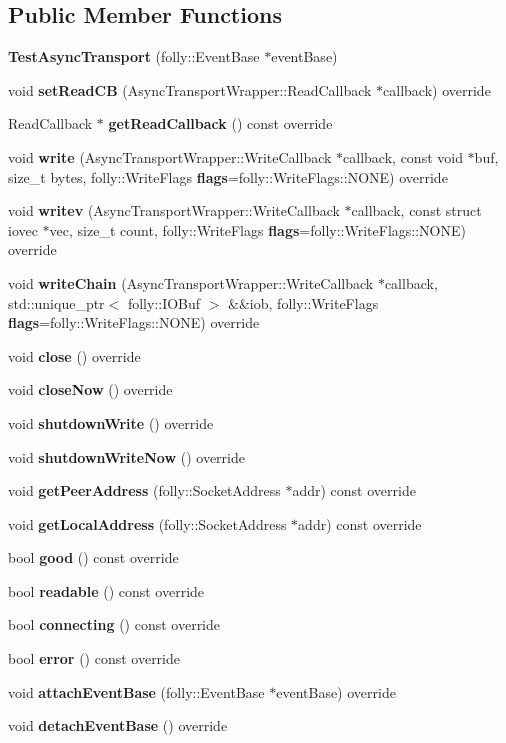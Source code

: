 \subsection*{Public Member Functions}
\begin{DoxyCompactItemize}
\item 
{\bf Test\+Async\+Transport} (folly\+::\+Event\+Base $\ast$event\+Base)
\item 
void {\bf set\+Read\+CB} (Async\+Transport\+Wrapper\+::\+Read\+Callback $\ast$callback) override
\item 
Read\+Callback $\ast$ {\bf get\+Read\+Callback} () const override
\item 
void {\bf write} (Async\+Transport\+Wrapper\+::\+Write\+Callback $\ast$callback, const void $\ast$buf, size\+\_\+t bytes, folly\+::\+Write\+Flags {\bf flags}=folly\+::\+Write\+Flags\+::\+N\+O\+NE) override
\item 
void {\bf writev} (Async\+Transport\+Wrapper\+::\+Write\+Callback $\ast$callback, const struct iovec $\ast$vec, size\+\_\+t count, folly\+::\+Write\+Flags {\bf flags}=folly\+::\+Write\+Flags\+::\+N\+O\+NE) override
\item 
void {\bf write\+Chain} (Async\+Transport\+Wrapper\+::\+Write\+Callback $\ast$callback, std\+::unique\+\_\+ptr$<$ folly\+::\+I\+O\+Buf $>$ \&\&iob, folly\+::\+Write\+Flags {\bf flags}=folly\+::\+Write\+Flags\+::\+N\+O\+NE) override
\item 
void {\bf close} () override
\item 
void {\bf close\+Now} () override
\item 
void {\bf shutdown\+Write} () override
\item 
void {\bf shutdown\+Write\+Now} () override
\item 
void {\bf get\+Peer\+Address} (folly\+::\+Socket\+Address $\ast$addr) const override
\item 
void {\bf get\+Local\+Address} (folly\+::\+Socket\+Address $\ast$addr) const override
\item 
bool {\bf good} () const override
\item 
bool {\bf readable} () const override
\item 
bool {\bf connecting} () const override
\item 
bool {\bf error} () const override
\item 
void {\bf attach\+Event\+Base} (folly\+::\+Event\+Base $\ast$event\+Base) override
\item 
void {\bf detach\+Event\+Base} () override
\item 

\end{DoxyCompactItemize}
